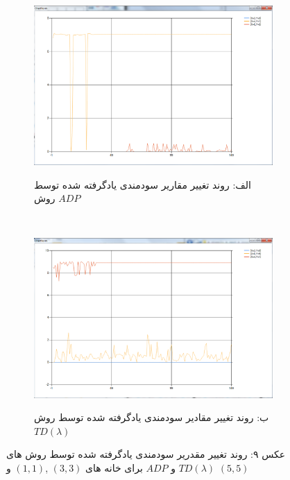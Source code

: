 \documentclass[10pt,a4paper]{article}
\begin{document}
\begin{figure}[h]
        \centering
        \begin{subfigure}[b]{0.5\textwidth}
            \includegraphics[width=\textwidth]{rlambda-adp}
            \begin{center}
                \textarabic{الف: روند تغییر مقاریر سودمندی یادگرفته شده توسط روش $ADP$ }
            \end{center}
        \end{subfigure}%
        ~ %
        \begin{subfigure}[b]{0.5\textwidth}
           \includegraphics[width=\textwidth]{rlambda-td}
            \begin{center}
                \textarabic{ب: روند تغییر مقادیر سودمندی یادگرفته شده توسط روش $TD(\lambda)$ }
            \end{center}
        \end{subfigure}
    \begin{center}
    \textarabic{عکس ۹: روند تغییر مقدریر سودمندی یادگرفته شده توسط روش های
     $TD(\lambda)$ و $ADP$
      برای خانه های 
     $(3,3)$ ,$(1, 1)$ و $(5, 5)$
     }
    \end{center}
\end{figure}
\end{document}
